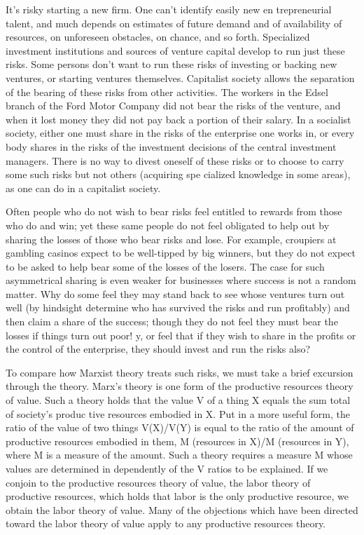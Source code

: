 \documentclass[11pt,openany]{book}
\begin{document}
It's risky starting a new firm. One can't identify easily new en trepreneurial talent, and much depends on estimates of future demand and of availability of resources, on unforeseen obstacles, on chance, and so forth. Specialized investment institutions and sources of venture capital develop to run just these risks. Some persons don't want to run these risks of investing or backing new ventures, or starting ventures themselves. Capitalist society allows the separation of the bearing of these risks from other activities. The workers in the Edsel branch of the Ford Motor Company did not bear the risks of the venture, and when it lost money they did not pay back a portion of their salary. In a socialist society, either one must share in the risks of the enterprise one works in, or every body shares in the risks of the investment decisions of the central investment managers. There is no way to divest oneself of these risks or to choose to carry some such risks but not others (acquiring spe cialized knowledge in some areas), as one can do in a capitalist society. 

Often people who do not wish to bear risks feel entitled to rewards from those who do and win; yet these same people do not feel obligated to help out by sharing the losses of those who bear risks and lose. For example, croupiers at gambling casinos expect to be well-tipped by big winners, but they do not expect to be asked to help bear some of the losses of the losers. The case for such asymmetrical sharing is even weaker for businesses where success is not a random matter. Why do some feel they may stand back to see whose ventures turn out well (by hindsight determine who has survived the risks and run profitably) and then claim a share of the success; though they do not feel they must bear the losses if things turn out poor! y, or feel that if they wish to share in the profits or the control of the enterprise, they should invest and run the risks also? 

To compare how Marxist theory treats such risks, we must take a brief excursion through the theory. Marx's theory is one form of the productive resources theory of value. Such a theory holds that the value V of a thing X equals the sum total of society's produc tive resources embodied in X. Put in a more useful form, the ratio of the value of two things V(X)/V(Y) is equal to the ratio of the amount of productive resources embodied in them, M (resources in X)/M (resources in Y), where M is a measure of the amount. Such a theory requires a measure M whose values are determined in dependently of the V ratios to be explained. If we conjoin to the productive resources theory of value, the labor theory of productive resources, which holds that labor is the only productive resource, we obtain the labor theory of value. Many of the objections which have been directed toward the labor theory of value apply to any productive resources theory. 
\end{document}
